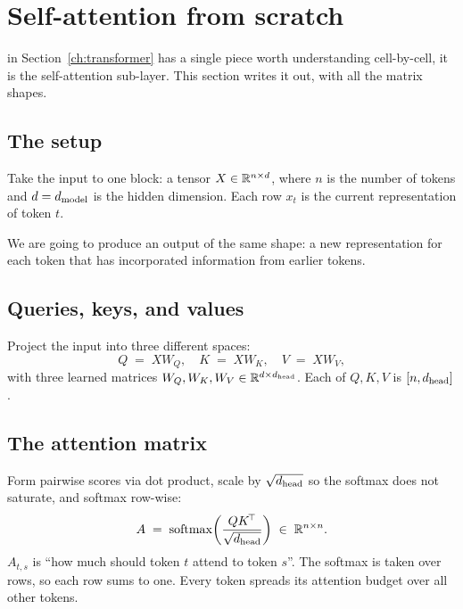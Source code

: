\section{Self-attention from scratch}
\label{ch:self-attention}

 in Section~\ref{ch:transformer} has a
single piece worth understanding cell-by-cell, it is the self-attention
sub-layer. This section writes it out, with all the matrix shapes.

\subsection{The setup}

Take the input to one block: a tensor \(X \in \mathbb{R}^{n \times d}\), where \(n\)
is the number of tokens and \(d = d_{\text{model}}\) is the hidden dimension. Each row
\(x_t\) is the current representation of token \(t\).

We are going to produce an output of the same shape: a new representation
for each token that has incorporated information from earlier tokens.

\subsection{Queries, keys, and values}

Project the input into three different spaces:
\begin{equation}
  Q \;=\; X W_Q, \quad
  K \;=\; X W_K, \quad
  V \;=\; X W_V,
\end{equation}
with three learned matrices \(W_Q, W_K, W_V \in \mathbb{R}^{d \times d_{\text{head}}}\). Each
of \(Q, K, V\) is \([n, d_{\text{head}}]\).

\subsection{The attention matrix}

Form pairwise scores via dot product, scale by \(\sqrt{d_{\text{head}}}\) so the
softmax does not saturate, and softmax row-wise:
\begin{equation}
  A \;=\; \operatorname{softmax}\!\left( \frac{Q K^{\!\top}}{\sqrt{d_{\text{head}}}} \right)
  \;\in\; \mathbb{R}^{n \times n}.
  \label{eq:attn-mat}
\end{equation}
\(A_{t,s}\) is ``how much should token \(t\) attend to token \(s\)''. The
softmax is taken over rows, so each row sums to one. Every token spreads
its attention budget over all other tokens.

